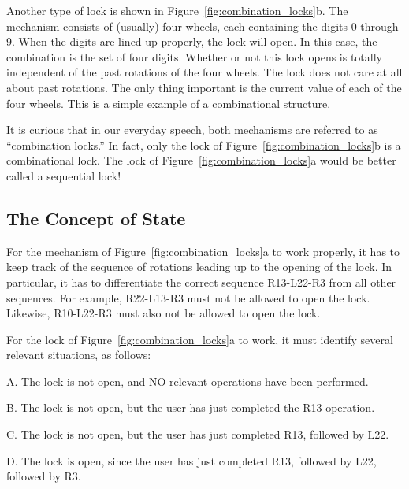 \documentclass{patt}
\begin{document}
Another type of lock is shown in Figure~\ref{fig:combination_locks}b.  
The mechanism consists
of (usually) four wheels, each containing the digits 0 through 9.
When the digits are lined up properly, the lock will open.  In this
case, the combination is the set of four digits.  Whether or not this
lock opens is totally independent of the past rotations of the four
wheels.  The lock does not care at all about past rotations.  The only
thing important is the current value of each of the four wheels.
This is a simple example of a combinational structure.

It is curious that in our everyday speech, both mechanisms are referred to 
as ``combination locks.''  In fact, only the lock of
Figure~\ref{fig:combination_locks}b is a combinational lock.  The lock of 
Figure~\ref{fig:combination_locks}a would be better called a sequential lock!

\subsection{The Concept of State}

For the mechanism of Figure~\ref{fig:combination_locks}a to work properly, 
it has to keep track of the sequence of rotations leading up to the opening 
of the lock.  In particular, it has to differentiate the correct sequence
R13-L22-R3 from all other sequences.  For example, R22-L13-R3 must not
be allowed to open the lock.  Likewise, R10-L22-R3 must also not be
allowed to open the lock.  

For the lock of Figure~\ref{fig:combination_locks}a to work, it must identify 
several relevant situations, as follows:

\begin{list}{}{\small\ttfamily\obeylines
    \settowidth{\labelwidth}{1.}%
    \setlength{\itemsep}{4pt}%
    \addtolength{\leftmargin}{\labelwidth}%
    \addtolength{\leftmargin}{\labelsep}%
    \def\makelabel#1{\hbox to \labelwidth{{#1}\hss}}%
    \setlength{\labelsep}{7pt}\fontsize{9}{10}\selectfont\ttfamily\obeylines\color{seventyblack}}
\item[A.] The lock is not open, and NO relevant operations have been
performed.
\item[B.] The lock is not open, but the user has just completed the
R13 operation.
\item[C.] The lock is not open, but the user has just completed R13,
followed by L22.
\item[D.] The lock is open, since the user has just completed R13, 
followed by L22, followed by R3.
\end{list}
\end{document}
